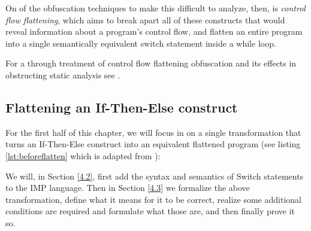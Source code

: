\documentclass[compsoc,conference,a4paper,10pt,times]{IEEEtran}
\begin{document}

\par On of the obfuscation techniques to make this difficult to analyze, then, is \emph{control flow flattening}, which aims to break apart all of these constructs that would reveal information about a program's control flow, and flatten an entire program into a single semantically equivalent switch statement inside a while loop.

\par For a through treatment of control flow flattening obfuscation and its effects in obstructing static analysis see \cite{Wang}.  

\subsection{Flattening an If-Then-Else construct}
For the first half of this chapter, we will focus in on a single transformation that turns an If-Then-Else construct into an equivalent flattened program (see listing \ref{lst:beforeflatten} which is adapted from \cite{Blazy2}):




We will, in Section \ref{4.2}, first add the syntax and semantics of Switch statements to the IMP language.  Then in Section \ref{4.3} we formalize the above transformation, define what it means for it to be correct, realize some additional conditions are required and formulate what those are, and then finally prove it so.
\end{document}
